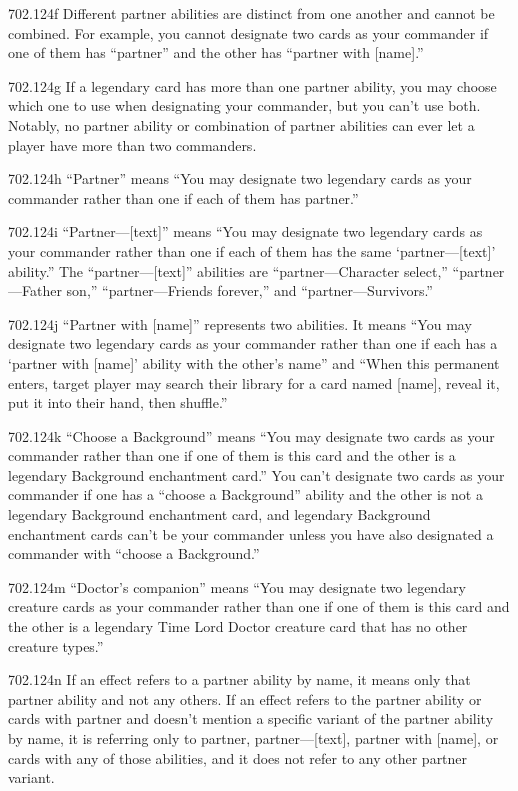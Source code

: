 702.124f Different partner abilities are distinct from one another and cannot be combined. For example, you cannot designate two cards as your commander if one of them has “partner” and the other has “partner with [name].”

702.124g If a legendary card has more than one partner ability, you may choose which one to use when designating your commander, but you can’t use both. Notably, no partner ability or combination of partner abilities can ever let a player have more than two commanders.

702.124h “Partner” means “You may designate two legendary cards as your commander rather than one if each of them has partner.”

702.124i “Partner—[text]” means “You may designate two legendary cards as your commander rather than one if each of them has the same ‘partner—[text]’ ability.” The “partner—[text]” abilities are “partner—Character select,” “partner—Father son,” “partner—Friends forever,” and “partner—Survivors.”

702.124j “Partner with [name]” represents two abilities. It means “You may designate two legendary cards as your commander rather than one if each has a ‘partner with [name]’ ability with the other’s name” and “When this permanent enters, target player may search their library for a card named [name], reveal it, put it into their hand, then shuffle.”

702.124k “Choose a Background” means “You may designate two cards as your commander rather than one if one of them is this card and the other is a legendary Background enchantment card.” You can’t designate two cards as your commander if one has a “choose a Background” ability and the other is not a legendary Background enchantment card, and legendary Background enchantment cards can’t be your commander unless you have also designated a commander with “choose a Background.”

702.124m “Doctor’s companion” means “You may designate two legendary creature cards as your commander rather than one if one of them is this card and the other is a legendary Time Lord Doctor creature card that has no other creature types.”

702.124n If an effect refers to a partner ability by name, it means only that partner ability and not any others. If an effect refers to the partner ability or cards with partner and doesn’t mention a specific variant of the partner ability by name, it is referring only to partner, partner—[text], partner with [name], or cards with any of those abilities, and it does not refer to any other partner variant.

